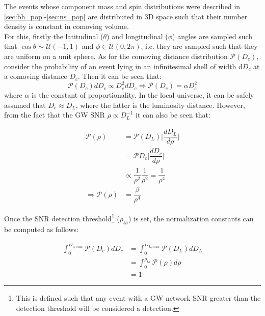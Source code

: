         The events whose component mass and spin distributions were described in
        \ref{sec:bh_pop}-\ref{sec:ns_pop} are distributed in 3D space such that their
        number density is constant in comoving volume.\\
        For this, firstly the latitudinal ($\theta$) and longitudinal ($\phi$) angles
        are sampled such that $\cos \theta \sim \mathcal{U}(-1, 1)$ and $\phi \in
        \mathcal{U}(0, 2\pi)$, i.e. they are sampled such that they are uniform on a
        unit sphere. As for the comoving distance distribution $\mathcal{P}(D_c)$,
        consider the probability of an event lying in an infinitesimal shell of width
        d$D_c$ at a comoving distance $D_c$.  Then it can be seen that:
        \begin{equation}
            \mathcal{P}(D_c) dD_c \propto D_c^2 dD_c \Rightarrow
                \boxed{\mathcal{P}(D_c) = \alpha D_c^2}
        \end{equation}
        where $\alpha$ is the constant of proportionality. In the local universe, it can
        be safely assumed that $D_c \approx D_L$, where the latter is the luminosity
        distance.  However, from the fact that the GW SNR $\rho \propto D_L^{-1}$ it can
        also be seen that:

        \begin{align}
            \mathcal{P}(\rho) &= \mathcal{P}(D_L)
                                  \Big \lvert \dfrac{dD_L}{d\rho} \Big \rvert \\
                              &= \mathcal{P}{D_c}
                                  \Big \lvert \dfrac{dD_c}{d\rho} \Big \rvert \\
                              &\propto \dfrac{1}{\rho^2} \dfrac{1}{\rho^2}
                                  = \dfrac{1}{\rho^4} \nonumber\\
            \Rightarrow \mathcal{P} (\rho) &= \dfrac{\beta}{\rho^4}
        \end{align}

        Once the SNR detection threshold\footnote{
            This is defined such that any event with a GW network SNR greater than the
            detection threshold will be considered a detection.
        } ($\rho_{th}$) is set, the normalization constants can be computed as follows:

        \begin{align}
            \int_0^{D_{c, max}}
                \mathcal{P}(D_c) dD_c &= \int_0^{D_{L, max}} \mathcal{P}(D_L) dD_L \\
                                      &= \int_0^{\rho_{th}} \mathcal{P}(\rho) d\rho \\
                                      &= 1
        \end{align}

